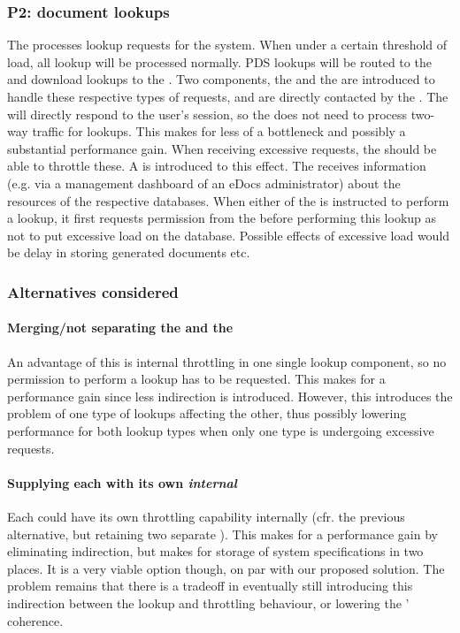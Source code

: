 \subsubsection{P2: document lookups}\label{march:p2}
The  processes lookup requests for the system. When under a certain threshold of load, all lookup will be processed normally. PDS lookups will be routed to the  and download lookups to the . Two components, the  and the  are introduced to handle these respective types of requests, and are directly contacted by the . The  will directly respond to the user's session, so the  does not need to process two-way traffic for lookups. This makes for less of a bottleneck and possibly a substantial performance gain. When receiving excessive requests, the  should be able to throttle these. A  is introduced to this effect. The  receives information (e.g. via a management dashboard of an eDocs administrator) about the resources of the respective databases. When either of the  is instructed to perform a lookup, it first requests permission from the  before performing this lookup as not to put excessive load on the database. Possible effects of excessive load would be delay in storing generated documents etc.

\subsubsection*{Alternatives considered}
\paragraph{Merging/not separating the  and the } An advantage of this is internal throttling in one single lookup component, so no permission to perform a lookup has to be requested. This makes for a performance gain since less indirection is introduced. However, this introduces the problem of one type of lookups affecting the other, thus possibly lowering performance for both lookup types when only one type is undergoing excessive requests.

\paragraph{Supplying each  with its own \emph{internal} }
Each  could have its own throttling capability internally (cfr. the previous alternative, but retaining two separate ). This makes for a performance gain by eliminating indirection, but makes for storage of system specifications in two places. It is a very viable option though, on par with our proposed solution. The problem remains that there is a tradeoff in eventually still introducing this indirection between the lookup and throttling behaviour, or lowering the ' coherence.

